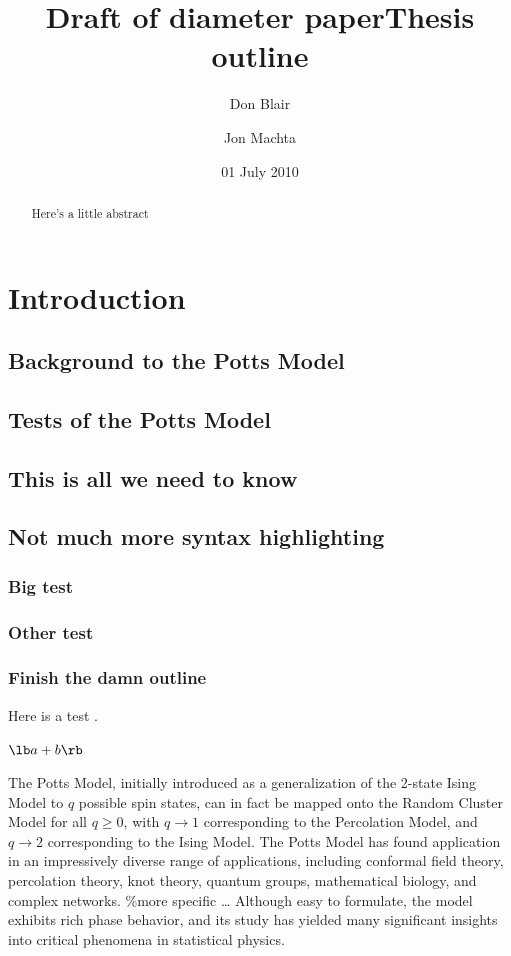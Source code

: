 \documentclass[aps, twocolumn, groupedaddress]{revtex4}
\title{Draft of diameter paper}
\author{Don Blair}
\date{01 July 2010}
\begin{document}
\setcounter{tocdepth}{3}
\tableofcontents
\vspace*{1cm}
\title{Thesis outline}
\author{Jon Machta}
\begin {abstract}
Here's a little abstract
\end{abstract}
\maketitle{}
\section{Introduction}
\label{sec-1}
\subsection{Background to the Potts Model}
\label{sec-1.1}
\subsection{Tests of the Potts Model}
\label{sec-1.2}
\subsection{This is all we need to know}
\label{sec-1.3}
\subsection{Not much more syntax highlighting}
\label{sec-1.4}
\subsubsection{Big test}
\label{sec-1.4.1}
\subsubsection{Other test}
\label{sec-1.4.2}
\subsubsection{Finish the damn outline}
\label{sec-1.4.3}

Here is a test \cite{OsSo04}.  

$\lb a + b \rb$    
    
The Potts Model, initially introduced as a generalization of the 2-state Ising Model to $q$ possible spin states, can in fact be mapped onto the Random Cluster Model for all $q \ge 0$, with $q \to 1$ corresponding to the Percolation Model, and $q \to 2$ corresponding to the Ising Model.  The Potts Model has found application in an impressively diverse range of applications, including conformal field theory, percolation theory, knot theory, quantum groups, mathematical biology, and complex networks.    
\%more specific \ldots{}    
Although easy to formulate, the model exhibits rich phase behavior, and its study has yielded many significant insights into critical phenomena in statistical physics. 
\end{document}
